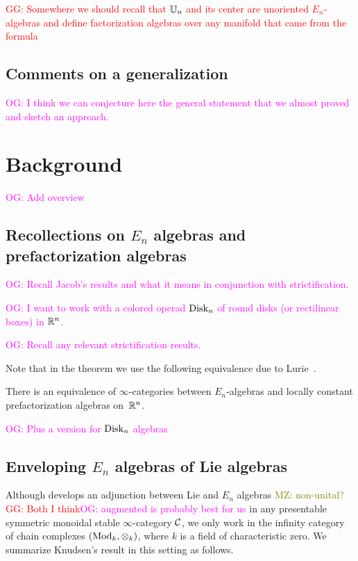 \documentclass[11pt]{amsart}
\numberwithin{equation}{section}
\def\owen{\textcolor{magenta}{OG: }\textcolor{magenta}}
\def\mahmoud{\textcolor{olive}{MZ: }\textcolor{olive}}
\def\greg{\textcolor{red}{GG: }\textcolor{red}}
\begin{document}
\greg{Somewhere we should recall that $\mathbb U_n$ and its center are unoriented $E_n$-algebras and define factorization algebras over any manifold that came from the formula}

\subsection{Comments on a generalization}

\owen{I think we can conjecture here the general statement that we almost proved and sketch an approach.}

\section{Background}
\label{sec: background}

\owen{Add overview}

\subsection{Recollections on $E_n$ algebras and prefactorization algebras}
\label{sec: en background}

\owen{Recall Jacob's results and what it means in conjunction with strictification.}

\owen{I want to work with a colored operad ${\rm Disk}_n$ of round disks (or rectilinear boxes) in $\mathbb R^n$.}

\owen{Recall any relevant strictification results.}

Note that in the theorem we use the following equivalence due to Lurie~\cite{LurieHA}. 

\begin{thm}
\label{thm:lurie1} 
There is an equivalence of $\infty$-categories between $E_n$-algebras and locally constant prefactorization algebras on~$\mathbb R^n$. 
\end{thm}

\owen{Plus a version for ${\rm Disk}_n$ algebras}

\subsection{Enveloping $E_n$ algebras of Lie algebras}
\label{sec: enveloping}

Although \cite{Knudsen} develops an adjunction between Lie and $E_n$ algebras \mahmoud{non-unital?}\greg{Both I think}\owen{augmented is probably best for us}
in any presentable symmetric monoidal stable $\infty$-category $\mathcal C$,
we only work in the infinity category of chain complexes $({\rm Mod}_k, \otimes_k)$, where $k$ is a field of characteristic zero.
We summarize Knudsen's result in this setting as follows.
\end{document}
